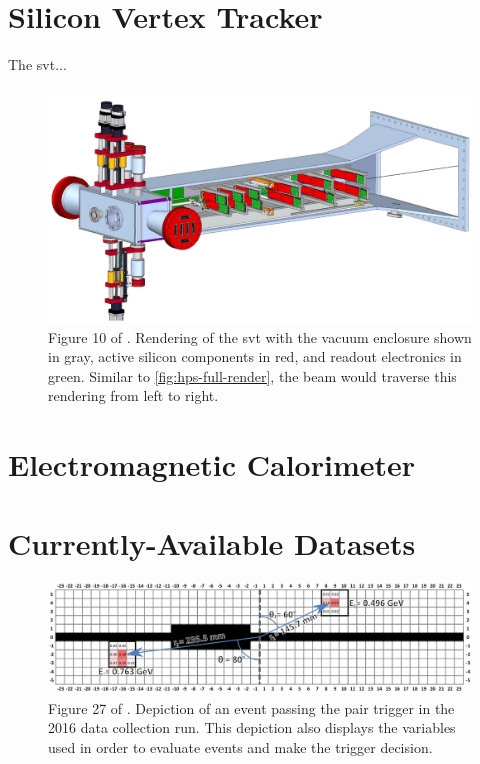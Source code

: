 \section{Silicon Vertex Tracker}
The \ac{svt}...

\begin{figure}
    \centering
    \includegraphics*[width=\textwidth]{figures/hps/experiment/smkcarty-thesis-fig-10-svt-render.png}
    \caption{
        Figure 10 of \cite{skmccarty-thesis-2020}. Rendering of the \ac{svt} with the vacuum
        enclosure shown in gray, active silicon components in red, and readout electronics in
        green. Similar to \cref{fig:hps-full-render}, the beam would traverse this rendering
        from left to right.
    }
    \label{fig:hps-svt-render}
\end{figure}

\section{Electromagnetic Calorimeter}

\section{Currently-Available Datasets}

\begin{figure}
    \centering
    \includegraphics[width=\textwidth]{figures/hps/experiment/smckarty-thesis-fig-27-pair-trigger-depiction.png}
    \caption{
        Figure 27 of \cite{skmccarty-thesis-2020}. Depiction of an event passing the pair trigger
        in the 2016 data collection run. This depiction also displays the variables used in order
        to evaluate events and make the trigger decision.
    }
    \label{fig:hps-pair-trigger-depiction}
\end{figure}